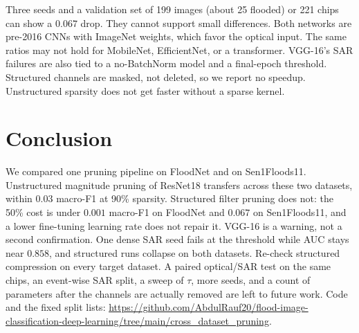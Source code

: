 \documentclass[conference]{IEEEtran}
\begin{document}
Three seeds and a validation set of 199 images (about 25 flooded) or
221 chips can show a $0.067$ drop. They cannot support small
differences. Both networks are pre-2016 CNNs with ImageNet weights,
which favor the optical input. The same ratios may not hold for
MobileNet, EfficientNet, or a transformer. VGG-16's SAR failures are
also tied to a no-BatchNorm model and a final-epoch threshold.
Structured channels are masked, not deleted, so we report no speedup.
Unstructured sparsity does not get faster without a sparse kernel.

\section{Conclusion}
We compared one pruning pipeline on FloodNet and on Sen1Floods11.
Unstructured magnitude pruning of ResNet18 transfers across these two
datasets, within $0.03$ macro-F1 at 90\% sparsity. Structured filter
pruning does not: the 50\% cost is under $0.001$ macro-F1 on FloodNet
and $0.067$ on Sen1Floods11, and a lower fine-tuning learning rate does
not repair it. VGG-16 is a warning, not a second confirmation. One
dense SAR seed fails at the threshold while AUC stays near $0.858$, and
structured runs collapse on both datasets. Re-check structured
compression on every target dataset. A paired optical/SAR test on the
same chips, an event-wise SAR split, a sweep of $\tau$, more seeds, and
a count of parameters after the channels are actually removed are left
to future work.
Code and the fixed split lists:
\url{https://github.com/AbdulRauf20/flood-image-classification-deep-learning/tree/main/cross_dataset_pruning}.
\end{document}
